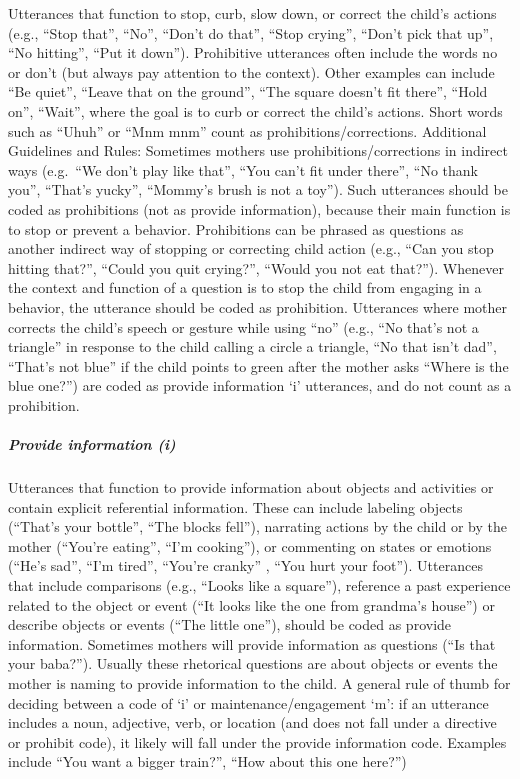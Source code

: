 \documentclass[
  12pt,
]{book}
\begin{document}
Utterances that function to stop, curb, slow down, or correct the child's actions (e.g., ``Stop that'', ``No'', ``Don't do that'', ``Stop crying'', ``Don't pick that up'', ``No hitting'', ``Put it down''). Prohibitive utterances often include the words no or don't (but always pay attention to the context). Other examples can include ``Be quiet'', ``Leave that on the ground'', ``The square doesn't fit there'', ``Hold on'', ``Wait'', where the goal is to curb or correct the child's actions. Short words such as ``Uhuh'' or ``Mnm mnm'' count as prohibitions/corrections.
Additional Guidelines and Rules:
Sometimes mothers use prohibitions/corrections in indirect ways (e.g.~``We don't play like that'',
``You can't fit under there'', ``No thank you'', ``That's yucky'', ``Mommy's brush is not a toy''). Such utterances should be coded as prohibitions (not as provide information), because their main function is to stop or prevent a behavior.
Prohibitions can be phrased as questions as another indirect way of stopping or correcting child action (e.g., ``Can you stop hitting that?'', ``Could you quit crying?'', ``Would you not eat that?''). Whenever the context and function of a question is to stop the child from engaging in a behavior, the utterance should be coded as prohibition.
Utterances where mother corrects the child's speech or gesture while using ``no'' (e.g., ``No that's not a triangle'' in response to the child calling a circle a triangle, ``No that isn't dad'', ``That's not blue'' if the child points to green after the mother asks ``Where is the blue one?'') are coded as provide information `i' utterances, and do not count as a prohibition.

\hypertarget{provide_info}{%
\subparagraph*{Provide information (i)}\label{provide_info}}

Utterances that function to provide information about objects and activities or contain explicit referential information. These can include labeling objects (``That's your bottle'', ``The blocks fell''), narrating actions by the child or by the mother (``You're eating'', ``I'm cooking''), or commenting on states or emotions (``He's sad'', ``I'm tired'', ``You're cranky'' , ``You hurt your foot''). Utterances that include comparisons (e.g., ``Looks like a square''), reference a past experience related to the object or event (``It looks like the one from grandma's house'') or describe objects or events (``The little one''), should be coded as provide information. Sometimes mothers will provide information as questions (``Is that your baba?''). Usually these rhetorical questions are about objects or events the mother is naming to provide information to the child.
A general rule of thumb for deciding between a code of `i' or maintenance/engagement `m': if an utterance includes a noun, adjective, verb, or location (and does not fall under a directive or prohibit code), it likely will fall under the provide information code. Examples include ``You want a bigger train?'', ``How about this one here?'')
\end{document}
